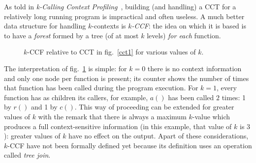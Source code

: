 \documentclass[a4paper,11pt]{report}
\begin{document}
As told in \emph{k-Calling Context Profiling}~\cite{kccf}, building (and handling) a CCT for a relatively long running program is impractical and often useless.
A much better data structure for handling $k$-contexts is \emph{$k$-CCF}: 
the idea on which it is based is to have a \emph{forest} formed by 
a tree (of at most $k$ levels) \emph{for each} function. 

\begin{figure}[h]

\begin{center}
\end{center}

\caption{$k$-CCF relative to CCT in fig.~\ref{cct1} for various values of $k$.}
\label{kccf1}

\end{figure}

The interpretation of fig.~\ref{kccf1} is simple: for $k=0$ there is no context
information and only one node per function is present; its counter shows the number of times that function has been called during the program execution. For $k=1$, every function has as children its callers, for example, $a()$ has been called $2$ times: 1 by $r()$ and 1 by $c()$. This way of proceeding can be extended for greater values of $k$ with the remark that 
there is always a maximum $k$-value which produces a full context-sensitive information 
(in this example, that value of $k$ is $3$): greater values of $k$ have no effect on the output. Apart of these considerations, $k$-CCF have not been formally defined yet because its definition uses an operation called \emph{tree join}.
\end{document}
